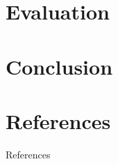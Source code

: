 \documentclass{beamer}
\begin{document}
\section{Evaluation}

%
\section{Conclusion}

\section*{References}
{
\begin{frame}{References}
    \printbibliography
\end{frame}
}
\end{document}
